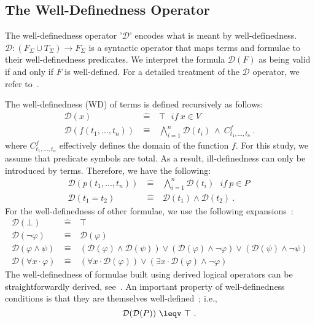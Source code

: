 \documentclass[copyright]{eptcs}
\begin{document}
\subsection{The Well-Definedness Operator}
The well-definedness operator '$\mathcal{D}$' encodes what is meant by well-definedness. $\mathcal{D}: (F_{\Sigma}\cup T_{\Sigma})\rightarrow F_{\Sigma}$ is a syntactic operator that maps terms and formulae to their well-definedness predicates. We interpret the formula $\mathcal{D}(F)$ as being valid if and only if $F$ is well-defined.
For a detailed treatment of the $\mathcal{D}$ operator, we refer to~\cite{723108}.
\par
The well-definedness (WD) of terms is defined recursively as follows:
\begin{eqnarray}
\mathcal{D}(x)~&\widehat{=}&~\top~~~if~x\in V~\label{wdVar}\\
\mathcal{D}(f(t_1,...,t_n))~&\widehat{=}&~\bigwedge_{i=1}^n \mathcal{D}(t_i)~\land~C^f_{t_1,...,t_n}~\label{wdFun}.
\end{eqnarray}
where $C^f_{t_1,...,t_n}$ effectively defines the domain of the function $f$. For this study, we assume that predicate symbols are total. As a result, ill-definedness can only be introduced by terms. Therefore, we have the following:
\begin{eqnarray}
\mathcal{D}(p(t_1,...,t_n))~&\widehat{=}&~\bigwedge_{i=1}^n \mathcal{D}(t_i)~~~if~p\in P~\label{wdPred}\\
\mathcal{D}(t_1 = t_2)~&\widehat{=}&~\mathcal{D}(t_1) \land \mathcal{D}(t_2)~\label{wdEq}.
\end{eqnarray}
For the well-definedness of other formulae, we use the following expansions~\cite{723108}:
\begin{eqnarray}
\mathcal{D}(\bot)~&\widehat{=}&~\top\\
\mathcal{D}(\lnot \varphi)~&\widehat{=}&~\mathcal{D}(\varphi)\\
\mathcal{D}(\varphi \land \psi)~&\widehat{=}&~(\mathcal{D}(\varphi)\land \mathcal{D}(\psi))\lor(\mathcal{D}(\varphi) \land \lnot \varphi)\lor(\mathcal{D}(\psi)\land \lnot \psi)\\
\mathcal{D}(\forall x\cdot \varphi)~&\widehat{=}&~(\forall x\cdot \mathcal{D}(\varphi))\lor(\exists x\cdot \mathcal{D}(\varphi)\land \lnot \varphi)
\end{eqnarray}
The well-definedness of formulae built using derived logical operators can be straightforwardly derived, see~\cite{farhad}. An important property of well-definedness conditions is that they are themselves well-defined~\cite{icfemMehta08}; i.e.,
\begin{equation*}
\mathcal{D}(\mathcal{D}(P))~\leqv~\top~.
\end{equation*}
\end{document}
